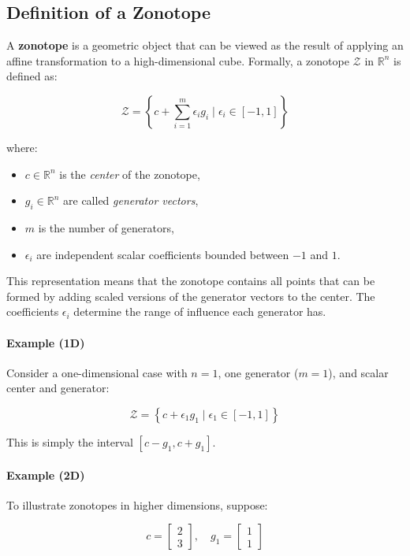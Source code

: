 \documentclass[oneside,11pt,dvipsnames]{book}
\numberwithin{equation}{section}
\theoremstyle{definition}
\theoremstyle{remark}
\begin{document}
\subsection{Definition of a Zonotope}

A \textbf{zonotope} is a geometric object that can be viewed as the result of applying an affine transformation to a high-dimensional cube. Formally, a zonotope \(\mathcal{Z}\) in \(\mathbb{R}^n\) is defined as:

\[
\mathcal{Z} = \left\{c + \sum_{i=1}^{m} \epsilon_i g_i \mid \epsilon_i \in [-1, 1]\right\}
\]

where:
\begin{itemize}
    \item \(c \in \mathbb{R}^n\) is the \textit{center} of the zonotope,
    \item \(g_i \in \mathbb{R}^n\) are called \textit{generator vectors},
    \item \(m\) is the number of generators,
    \item \(\epsilon_i\) are independent scalar coefficients bounded between \(-1\) and \(1\).
\end{itemize}

This representation means that the zonotope contains all points that can be formed by adding scaled versions of the generator vectors to the center. The coefficients \(\epsilon_i\) determine the range of influence each generator has.

\paragraph{Example (1D)} Consider a one-dimensional case with \(n = 1\), one generator (\(m = 1\)), and scalar center and generator:

\[
\mathcal{Z} = \left\{c + \epsilon_1 g_1 \mid \epsilon_1 \in [-1, 1]\right\}
\]

This is simply the interval \([c - g_1, c + g_1]\).

\paragraph{Example (2D)} To illustrate zonotopes in higher dimensions, suppose:

\[
c = \begin{bmatrix}2 \\ 3\end{bmatrix}, \quad
g_1 = \begin{bmatrix}1 \\ 1\end{bmatrix}
\]
\end{document}
